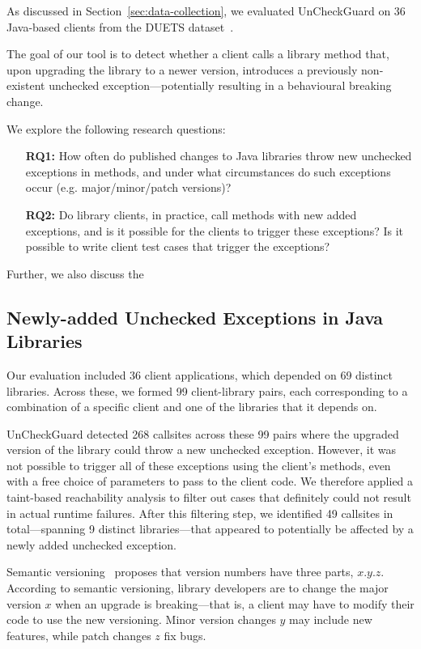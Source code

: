 As discussed in Section~\ref{sec:data-collection}, we evaluated UnCheckGuard on 36 Java-based clients from the DUETS dataset~\cite{durieux21:_duets}.

The goal of our tool is to detect whether a client calls a library method that, upon upgrading the library to a newer version, introduces a previously non-existent unchecked exception—potentially resulting in a behavioural breaking change.

We explore the following research questions:

\begin{itemize}
  \item[\textbf{RQ1:}] How often do published changes to Java libraries throw new unchecked exceptions in methods,
and under what circumstances do such exceptions occur (e.g. major/minor/patch versions)?
  \item[\textbf{RQ2:}]  Do library clients, in practice, call methods with new added exceptions, and is it possible for the clients to trigger these exceptions? Is it possible to write client test cases that trigger the exceptions?
\end{itemize}


Further, we also discuss the 

\subsection{Newly-added Unchecked Exceptions in Java Libraries}

Our evaluation included 36 client applications, which depended on 69 distinct libraries. Across these, we formed 99 client-library pairs, each corresponding to a combination of a specific client and one of the libraries that it depends on. 

UnCheckGuard detected 268 callsites across these 99 pairs where the upgraded version of the library could throw a new unchecked exception. However, it was not possible to trigger all of these exceptions using the client's methods, even with a free choice of parameters to pass to the client code. We therefore applied a taint-based reachability analysis to filter out cases that definitely could not result in actual runtime failures. After this filtering step, we identified 49 callsites in total—spanning 9 distinct libraries—that appeared to potentially be affected by a newly added unchecked exception.

Semantic versioning~\cite{preston-werner23:_seman_version} proposes that version numbers have three parts, $x.y.z$. According to semantic versioning, library developers are to change the major version $x$ when an upgrade is breaking---that is, a client may have to modify their code to use the new versioning. Minor version changes $y$ may include new features, while patch changes $z$ fix bugs.

